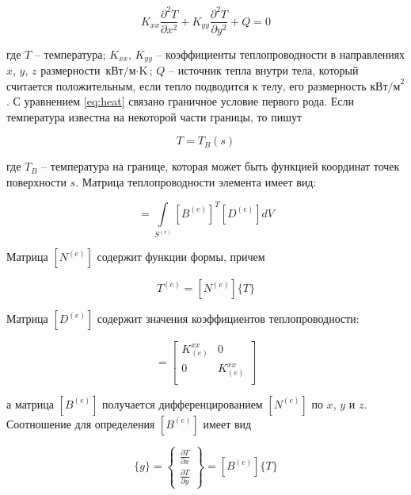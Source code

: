 \documentclass[a4paper, 14pt]{extarticle}
\begin{document}
\begin{equation}
	K_{xx} \frac{\partial^2 T}{\partial x^2} +
	K_{yy} \frac{\partial^2 T}{\partial y^2} +
	Q = 0
\end{equation} \label{eq:heat}

где $T$ – температура; $K_{xx}$, $K_{yy}$ – коэффициенты теплопроводности в
направлениях $x$, $y$, $z$ размерности $ \text{кВт/м} \cdot \text{K} $; $Q$ –
источник тепла внутри тела, который считается положительным, если тепло
подводится к телу, его размерность $\text{кВт/м}^2$. С уравнением \ref{eq:heat}
связано граничное условие первого рода. Если температура известна на некоторой
части границы, то пишут

\begin{equation}
	T = T_B(s)
\end{equation}

где $T_B$ – температура на границе, которая может быть функцией координат точек
поверхности $s$. Матрица теплопроводности элемента имеет вид:

\begin{equation}
	[k^{(e)}] =
	\int\limits_{S^{(e)}} [B^{(e)}]^T [D^{(e)}] dV
\end{equation}

Матрица $[N^{(e)}]$ содержит функции формы, причем

\begin{equation}
	T^{(e)} = [N^{(e)}]\{T\}
\end{equation}

Матрица $[D^{(e)}]$ содержит значения коэффициентов теплопроводности:

\begin{equation}
	[D^{(e)}] = \begin{bmatrix}
		K_{(e)}^{xx} & 0            \\
		0            & K_{(e)}^{xx} \\
	\end{bmatrix}
\end{equation}

а матрица $[B^{(e)}]$ получается дифференцированием $[N^{(e)}]$ по $x$, $y$ и
$z$. Соотношение для определения $[B^{(e)}]$ имеет вид

\begin{equation}
	\{g\} = \begin{Bmatrix}
	\frac{\partial T}{\partial x} \\
	\frac{\partial T}{\partial y}
	\end{Bmatrix} = [B^{(e)}]\{T\}
\end{equation}
\end{document}
